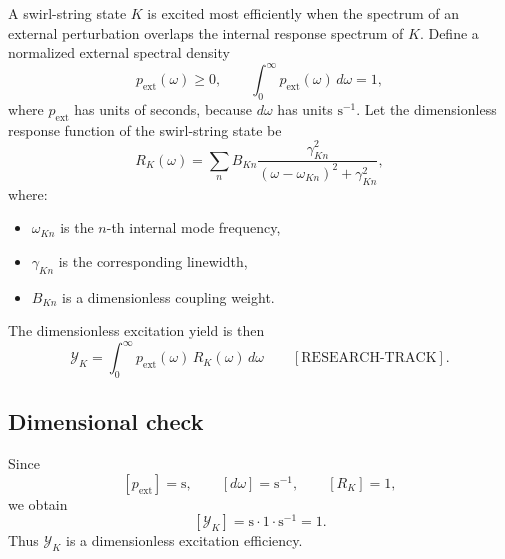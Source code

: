        A swirl-string state \(K\) is excited most efficiently when the spectrum of an external perturbation overlaps the internal response spectrum of \(K\). Define a normalized external spectral density
        \begin{equation}
            p_{\mathrm{ext}}(\omega)\ge 0,
            \qquad
            \int_0^\infty p_{\mathrm{ext}}(\omega)\,d\omega = 1,
            \label{eq:p_ext_normalized}
        \end{equation}
        where \(p_{\mathrm{ext}}\) has units of seconds, because \(d\omega\) has units \(\mathrm{s}^{-1}\). Let the dimensionless response function of the swirl-string state be
        \begin{equation}
            R_K(\omega)
            =
            \sum_{n}
            B_{Kn}
            \frac{\gamma_{Kn}^{2}}
            {(\omega-\omega_{Kn})^{2}+\gamma_{Kn}^{2}},
            \label{eq:RK_lorentzian}
        \end{equation}
        where:
        \begin{itemize}
            \item \(\omega_{Kn}\) is the \(n\)-th internal mode frequency,
            \item \(\gamma_{Kn}\) is the corresponding linewidth,
            \item \(B_{Kn}\) is a dimensionless coupling weight.
        \end{itemize}
        
        The dimensionless excitation yield is then
        \begin{equation}
            \boxed{
                \mathcal{Y}_K
                =
                \int_0^\infty
                p_{\mathrm{ext}}(\omega)\,
                R_K(\omega)\,
                d\omega
            }
            \qquad
            [\mathrm{RESEARCH\text{-}TRACK}].
            \label{eq:SST_resonance_yield}
        \end{equation}
    
    \subsection*{Dimensional check}
        
        Since
        \[
            [p_{\mathrm{ext}}]=\mathrm{s},
            \qquad
            [d\omega]=\mathrm{s}^{-1},
            \qquad
            [R_K]=1,
        \]
        we obtain
        \[
            [\mathcal{Y}_K]
            =
            \mathrm{s}\cdot 1 \cdot \mathrm{s}^{-1}
            =
            1.
        \]
        Thus \(\mathcal{Y}_K\) is a dimensionless excitation efficiency.
    
